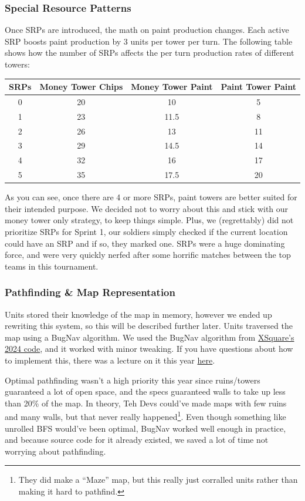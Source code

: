 \newpage
\subsubsection{Special Resource Patterns}

Once SRPs are introduced, the math on paint production changes. Each active SRP boosts paint production by 3 units per tower per turn. The following table shows how the number of SRPs affects the per turn production rates of different towers:
\begin{center}
  \begin{tabular}{c | c | c | c}
    SRPs & Money Tower Chips & Money Tower Paint & Paint Tower Paint \\
    \hline
    0 & 20 & 10 & 5 \\
    1 & 23 & 11.5 & 8 \\
    2 & 26 & 13 & 11 \\
    3 & 29 & 14.5 & 14 \\
    4 & 32 & 16 & 17 \\
    5 & 35 & 17.5 & 20
  \end{tabular}
\end{center}
As you can see, once there are 4 or more SRPs, paint towers are better suited for their intended purpose. We decided not to worry about this and stick with our money tower only strategy, to keep things simple. Plus, we (regrettably) did not prioritize SRPs for Sprint 1, our soldiers simply checked if the current location could have an SRP and if so, they marked one. SRPs were a huge dominating force, and were very quickly nerfed after some horrific matches between the top teams in this tournament.

\subsubsection{Pathfinding \& Map Representation}

Units stored their knowledge of the map in memory, however we ended up rewriting this system, so this will be described further later. Units traversed the map using a BugNav algorithm. We used the BugNav algorithm from \href{https://github.com/IvanGeffner/BTC24/blob/master/BugPath.java}{XSquare's 2024 code}, and it worked with minor tweaking. If you have questions about how to implement this, there was a lecture on it this year \href{https://www.youtube.com/live/Mqk50BQH3oQ?si=6qL5WAXmSOS2K3OR}{here}.

\medskip

Optimal pathfinding wasn't a high priority this year since ruins/towers guaranteed a lot of open space, and the specs guaranteed walls to take up less than 20\% of the map. In theory, Teh Devs could've made maps with few ruins and many walls, but that never really happened\footnote{They did make a ``Maze'' map, but this really just corralled units rather than making it hard to pathfind.}. Even though something like unrolled BFS would've been optimal, BugNav worked well enough in practice, and because source code for it already existed, we saved a lot of time not worrying about pathfinding.

